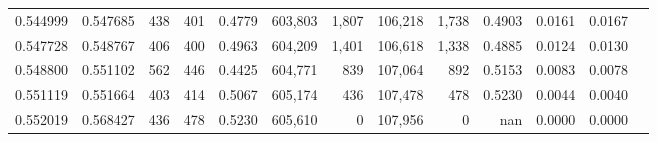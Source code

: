 \begin{tabular}{rrrrrrrrrrrrr}
0.544999 & 0.547685 &    438 &   401 &                                     0.4779 & 603,803 &   1,807 & 106,218 &   1,738 & 0.4903 & 0.0161 & 0.0167 \\
0.547728 & 0.548767 &    406 &   400 &                                     0.4963 & 604,209 &   1,401 & 106,618 &   1,338 & 0.4885 & 0.0124 & 0.0130 \\
0.548800 & 0.551102 &    562 &   446 &                                     0.4425 & 604,771 &     839 & 107,064 &     892 & 0.5153 & 0.0083 & 0.0078 \\
0.551119 & 0.551664 &    403 &   414 &                                     0.5067 & 605,174 &     436 & 107,478 &     478 & 0.5230 & 0.0044 & 0.0040 \\
0.552019 & 0.568427 &    436 &   478 &                                     0.5230 & 605,610 &       0 & 107,956 &       0 &    nan & 0.0000 & 0.0000 \\
\bottomrule
\end{tabular}

